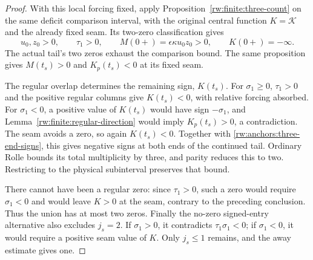 \begin{proof}
With this local forcing fixed, apply
Proposition~\ref{rw:finite:three-count} on the same deficit comparison
interval, with the original central function $K=\mathcal K$ and
the already fixed seam. Its two-zero classification gives
\begin{equation}\label{rw:anchors:three-end-signs}
 u_0,z_0>0,\qquad \tau_1>0,\qquad
 M(0+)=\epsilon\kappa u_0z_0>0,\qquad K(0+)=-\infty.
\end{equation}
The actual tail's two zeros exhaust the comparison bound.
The same proposition gives $M(t_s)>0$ and $K_p(t_s)<0$ at its
fixed seam.

The regular overlap determines the remaining sign, $K(t_s)$.
For $\sigma_1\ge0$, $\tau_1>0$ and the positive regular columns
give $K(t_s)<0$, with relative forcing absorbed. For $\sigma_1<0$,
a positive value of $K(t_s)$ would have sign $-\sigma_1$, and
Lemma~\ref{rw:finite:regular-direction} would imply $K_p(t_s)>0$,
a contradiction. The seam avoids a zero, so again $K(t_s)<0$.
Together with \eqref{rw:anchors:three-end-signs}, this gives negative
signs at both ends of the continued tail. Ordinary Rolle bounds its
total multiplicity by three, and parity reduces this to two.
Restricting to the physical subinterval preserves that bound.

There cannot have been a regular zero: since $\tau_1>0$, such a zero
would require $\sigma_1<0$ and would leave $K>0$ at the seam,
contrary to the preceding conclusion. Thus the union has at most two
zeros. Finally the no-zero signed-entry alternative also excludes
$j_s=2$. If $\sigma_1>0$, it contradicts $\tau_1\sigma_1<0$;
if $\sigma_1<0$, it would require a positive seam value of $K$.
Only $j_s\le1$ remains, and the away estimate gives one.
\end{proof}

